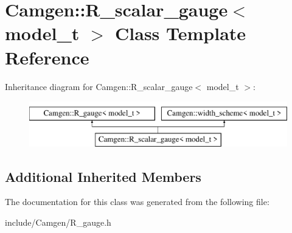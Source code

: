 \hypertarget{a00454}{\section{Camgen\-:\-:R\-\_\-scalar\-\_\-gauge$<$ model\-\_\-t $>$ Class Template Reference}
\label{a00454}
}
Inheritance diagram for Camgen\-:\-:R\-\_\-scalar\-\_\-gauge$<$ model\-\_\-t $>$\-:\begin{figure}[H]
\begin{center}
\leavevmode
\includegraphics[height=2.000000cm]{a00454}
\end{center}
\end{figure}
\subsection*{Additional Inherited Members}


The documentation for this class was generated from the following file\-:\begin{DoxyCompactItemize}
\item 
include/\-Camgen/R\-\_\-gauge.\-h\end{DoxyCompactItemize}

